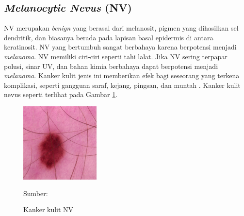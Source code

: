     \subsection{\textit{Melanocytic Nevus} (NV)}
    NV merupakan \textit{benign} yang berasal dari melanosit, pigmen yang dihasilkan sel dendritik, dan biasanya berada pada lapisan basal epidermis di antara keratinosit. NV yang bertumbuh sangat berbahaya karena berpotensi menjadi \textit{melanoma}. NV memiliki ciri-ciri seperti tahi lalat. Jika NV sering terpapar polusi, sinar UV, dan bahan kimia berbahaya dapat berpotensi menjadi \textit{melanoma}. Kanker kulit jenis ini memberikan efek bagi seseorang yang terkena komplikasi, seperti gangguan saraf, kejang, pingsan, dan muntah \citep{Fuadah2020a}. Kanker kulit nevus seperti terlihat pada Gambar \ref{fig:nv}.
    \begin{figure}[H] 
        \begin{center} 
            \includegraphics[width=4cm]{img/bab2/nv.jpg}
            \caption{Kanker kulit NV} 
            \label{fig:nv}
            Sumber: \citep{Codella2018,Combalia2019,Tschandl2018}
        \end{center} 
    \end{figure}

